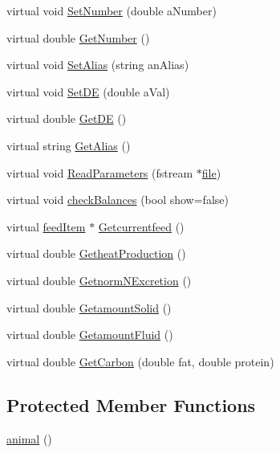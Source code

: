 \begin{DoxyCompactItemize}
\item 
virtual void \hyperlink{classanimal_abe026348f883bc244e1d8e473b173c81}{SetNumber} (double aNumber)
\item 
virtual double \hyperlink{classanimal_acaf29d614c9931e3ddc1e39447d5b2f8}{GetNumber} ()
\item 
virtual void \hyperlink{classanimal_a17002f60dd1721a4a73dd67bf4905ca0}{SetAlias} (string anAlias)
\item 
virtual void \hyperlink{classanimal_ab02fcc3a55c323f5bde1e50515e049ff}{SetDE} (double aVal)
\item 
virtual double \hyperlink{classanimal_aef7118b0c94cb1bc05aa8783d80e10f0}{GetDE} ()
\item 
virtual string \hyperlink{classanimal_a1fd13dcc0f1482d3f288d2265d1ed1ec}{GetAlias} ()
\item 
virtual void \hyperlink{classanimal_ad7a71ab5ae87becfa921f70501cf4ee1}{ReadParameters} (fstream $\ast$\hyperlink{classbase_a3af52ee9891719d09b8b19b42450b6f6}{file})
\item 
virtual void \hyperlink{classanimal_a393e6582d15379a0dd58c0d7e1faf9a7}{checkBalances} (bool show=false)
\item 
virtual \hyperlink{classfeed_item}{feedItem} $\ast$ \hyperlink{classanimal_a9b3e9394438db452b3c1dcbd94419a9b}{Getcurrentfeed} ()
\item 
virtual double \hyperlink{classanimal_a1530f8f6b797c184ea18dff86970100a}{GetheatProduction} ()
\item 
virtual double \hyperlink{classanimal_ae10316ed2eb8bcf183540382bd67f0a3}{GetnormNExcretion} ()
\item 
virtual double \hyperlink{classanimal_a7d4699bba0c75390bb33bdf70254ad64}{GetamountSolid} ()
\item 
virtual double \hyperlink{classanimal_a47dafe1783cc6864cf11b345efc5e622}{GetamountFluid} ()
\item 
virtual double \hyperlink{classanimal_a03c49c3eccec4f4eec1275bd707595ab}{GetCarbon} (double fat, double protein)
\end{DoxyCompactItemize}
\subsection*{Protected Member Functions}
\begin{DoxyCompactItemize}
\item 
\hyperlink{classanimal_a1fd2e1162143bd494f2629975c01b96a}{animal} ()
\end{DoxyCompactItemize}
